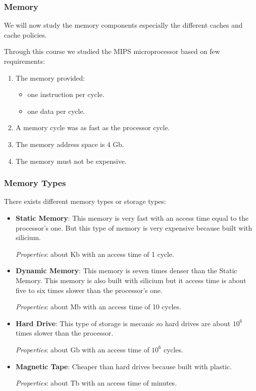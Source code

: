 
\begin{frame}
  \frametitle{Memory}

  We will now study the memory components especially the different caches
  and cache policies.

  \-

  Through this course we studied the MIPS microprocessor based on few
  requirements:

  \begin{enumerate}
    \item
      The memory provided:

      \begin{itemize}
	\item
	  one instruction per cycle.
	\item
	  one data per cycle.
      \end{itemize}
    \item
      A memory cycle was as fast as the processor cycle.
    \item
      The memory address space is 4 Gb.
    \item
      The memory must not be expensive.
  \end{enumerate}
\end{frame}


\begin{frame}
  \frametitle{Memory Types}

  There exists different memory types or storage types:

  \begin{itemize}
    \item
      \textbf{Static Memory}: This memory is very fast with an access time
      equal to the processor's one. But this type of memory is very
      expensive because built with silicium.

      \textit{Properties}: about Kb with an access time of 1 cycle.
    \item
      \textbf{Dynamic Memory}: This memory is seven times denser than
      the Static Memory. This memory is also built with silicium but it
      access time is about five to six times slower than the processor's
      one.

      \textit{Properties}: about Mb with an access time of 10 cycles.
    \item
      \textbf{Hard Drive}: This type of storage is mecanic so hard drives
      are about $10^{6}$ times slower than the processor.

      \textit{Properties}: about Gb with an access time of $10^{6}$ cycles.
    \item
      \textbf{Magnetic Tape}: Cheaper than hard drives because built with
      plastic.

      \textit{Properties}: about Tb with an access time of minutes.
  \end{itemize}
\end{frame}

